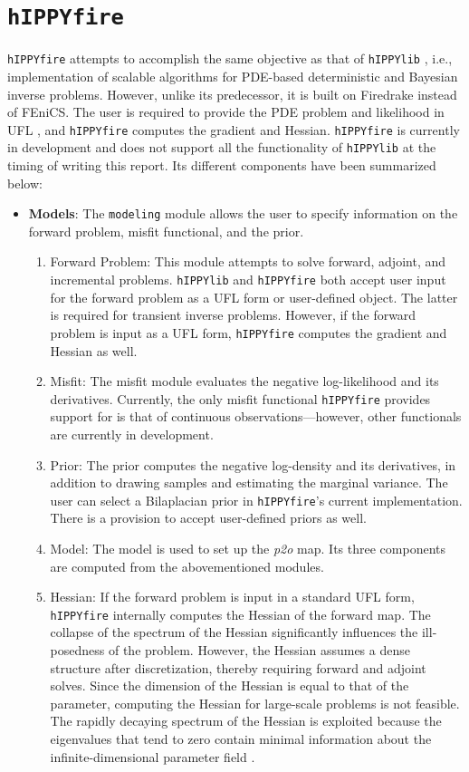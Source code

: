 \section{ \texttt{hIPPYfire} }
\texttt{hIPPYfire} attempts to accomplish the same objective as that of \texttt{hIPPYlib} , i.e., implementation of scalable algorithms for PDE-based deterministic and Bayesian inverse problems. However, unlike its predecessor, it is built on Firedrake instead of FEniCS. The user is required to provide the PDE problem and likelihood in UFL \cite{alnaes2014unified}, and \texttt{hIPPYfire} computes the gradient and Hessian. \texttt{hIPPYfire} is currently in development and does not support all the functionality of \texttt{hIPPYlib} at the timing of writing this report. Its different components have been summarized below:
\begin{itemize}
    \item \textbf{Models}: The \texttt{modeling} module allows the user to specify information on the forward problem, misfit functional, and the prior. 
    \begin{enumerate}
        \item Forward Problem: This module attempts to solve forward, adjoint, and incremental problems. \texttt{hIPPYlib} and \texttt{hIPPYfire} both accept user input for the forward problem as a UFL form or user-defined object. The latter is required for transient inverse problems. However, if the forward problem is input as a UFL form, \texttt{hIPPYfire} computes the gradient and Hessian as well.
        \item Misfit: The misfit module evaluates the negative log-likelihood and its derivatives. Currently, the only misfit functional \texttt{hIPPYfire} provides support for is that of continuous observations---however, other functionals are currently in development.
        \item Prior: The prior computes the negative log-density and its derivatives, in addition to drawing samples and estimating the marginal variance. The user can select a Bilaplacian prior in \texttt{hIPPYfire}'s current implementation. There is a provision to accept user-defined priors as well.
        \item Model: The model is used to set up the \textit{p2o} map. Its three components are computed from the abovementioned modules.
        \item Hessian: If the forward problem is input in a standard UFL form, \texttt{hIPPYfire} internally computes the Hessian of the forward map. The collapse of the spectrum of the Hessian significantly influences the ill-posedness of the problem. However, the Hessian assumes a dense structure after discretization, thereby requiring forward and adjoint solves. Since the dimension of the Hessian is equal to that of the parameter, computing the Hessian for large-scale problems is not feasible. The rapidly decaying spectrum of the Hessian is exploited because the eigenvalues that tend to zero contain minimal information about the infinite-dimensional parameter field \cite{flath2011fast, bui2012analysis}.   

\end{enumerate}
\end{itemize}
